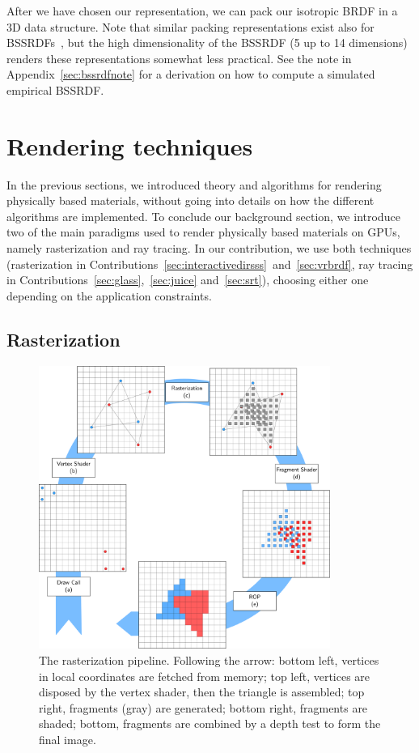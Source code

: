 After we have chosen our representation, we can pack our isotropic BRDF in a 3D data structure. Note that similar packing representations exist also for BSSRDFs~\cite{Donner2009}, but the high dimensionality of the BSSRDF (5 up to 14 dimensions) renders these representations somewhat less practical. See the note in Appendix~\ref{sec:bssrdfnote} for a derivation on how to compute a simulated empirical BSSRDF. 

\section{Rendering techniques} 
\label{sec:renderingparadigms}

In the previous sections, we introduced theory and algorithms for rendering physically based materials, without going into details on how the different algorithms are implemented. To conclude our background section, we introduce two of the main paradigms used to render physically based materials on GPUs, namely rasterization and ray tracing. In our contribution, we use both techniques (rasterization in Contributions~\ref{sec:interactivedirsss}~and~\ref{sec:vrbrdf}, ray tracing in Contributions~\ref{sec:glass},~\ref{sec:juice} and~\ref{sec:srt}), choosing either one depending on the application constraints.

\subsection{Rasterization}

\begin{figure}
\centering
	 \includegraphics[width=0.85\textwidth]{figures/rasterization_pipeline.pdf} 
\caption{The rasterization pipeline. Following the arrow: bottom left, vertices in local coordinates are fetched from memory; top left, vertices are disposed by the vertex shader, then the triangle is assembled; top right, fragments (gray) are generated; bottom right, fragments are shaded; bottom, fragments are combined by a depth test to form the final image. } 
\label{fig:rasterpipeline}
\end{figure}

